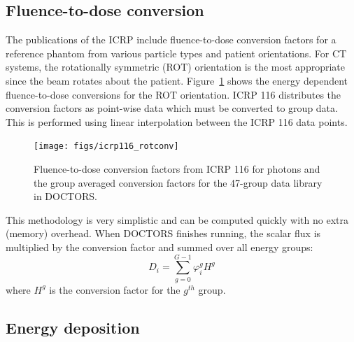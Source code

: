 \subsection{Fluence-to-dose conversion}

The publications of the ICRP include fluence-to-dose conversion factors for a reference phantom from various particle types and patient orientations. For CT systems, the rotationally symmetric (ROT) orientation is the most appropriate since the beam rotates about the patient. Figure~\ref{fig:icrp116_rotconv} shows the energy dependent fluence-to-dose conversions for the ROT orientation. ICRP 116 distributes the conversion factors as point-wise data which must be converted to group data. This is performed using linear interpolation between the ICRP 116 data points.

\begin{figure}[tb]
  \begin{center}
   \texttt{[image: figs/icrp116\_rotconv]}
  \end{center}
  \caption{Fluence-to-dose conversion factors from ICRP 116 for photons and the group averaged conversion factors for the 47-group data library in DOCTORS.}
\label{fig:icrp116_rotconv}
\end{figure}

This methodology is very simplistic and can be computed quickly with no extra (memory) overhead. When DOCTORS finishes running, the scalar flux is multiplied by the conversion factor and summed over all energy groups:
\begin{equation}\label{eq:doseicrp}
D_i = \sum_{g=0}^{G-1} \varphi_i^g H^g
\end{equation}
where $H^g$ is the conversion factor for the $g^{th}$ group.

\subsection{Energy deposition}

